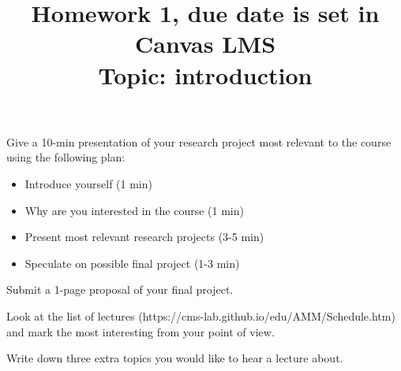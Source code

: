 \documentclass{homework}
\begin{document}
\title{Homework 1, due date is set in Canvas LMS \\ Topic: introduction}
\maketitle

\begin{task} Give a 10-min presentation of your research project most relevant to the course using the following plan:
\begin{itemize}\setlength{\itemsep}{0ex}
\item Introduce yourself (1 min)
\item Why are you interested in the course (1 min)
\item Present most relevant research projects (3-5 min)
\item Speculate on possible final project (1-3 min)
\end{itemize}
\end{task}

\begin{task} Submit a 1-page proposal of your final project.
\end{task}

\begin{task}
Look at the list of lectures (https://cms-lab.github.io/edu/AMM/Schedule.htm) and mark the most interesting from your point of view. 
\end{task}

\begin{task}
Write down three extra topics you would like to hear a lecture about.
\end{task}
\end{document}
